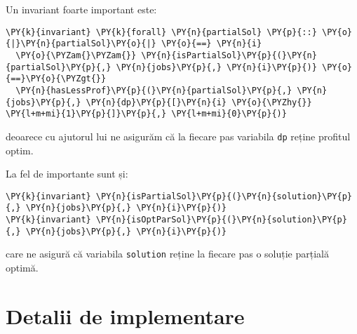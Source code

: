 Un invariant foarte important este:
\begin{Verbatim}[commandchars=\\\{\}, fontsize=\footnotesize]
\PY{k}{invariant} \PY{k}{forall} \PY{n}{partialSol} \PY{p}{::} \PY{o}{|}\PY{n}{partialSol}\PY{o}{|} \PY{o}{==} \PY{n}{i}
  \PY{o}{\PYZam{}\PYZam{}} \PY{n}{isPartialSol}\PY{p}{(}\PY{n}{partialSol}\PY{p}{,} \PY{n}{jobs}\PY{p}{,} \PY{n}{i}\PY{p}{)} \PY{o}{==}\PY{o}{\PYZgt{}} 
  \PY{n}{hasLessProf}\PY{p}{(}\PY{n}{partialSol}\PY{p}{,} \PY{n}{jobs}\PY{p}{,} \PY{n}{dp}\PY{p}{[}\PY{n}{i} \PY{o}{\PYZhy{}} \PY{l+m+mi}{1}\PY{p}{]}\PY{p}{,} \PY{l+m+mi}{0}\PY{p}{)}
\end{Verbatim}
deoarece cu ajutorul lui ne asigurăm că la fiecare pas variabila \texttt{dp} reține profitul optim. 

La fel de importante sunt și:
\begin{Verbatim}[commandchars=\\\{\}, fontsize=\footnotesize]
\PY{k}{invariant} \PY{n}{isPartialSol}\PY{p}{(}\PY{n}{solution}\PY{p}{,} \PY{n}{jobs}\PY{p}{,} \PY{n}{i}\PY{p}{)}
\PY{k}{invariant} \PY{n}{isOptParSol}\PY{p}{(}\PY{n}{solution}\PY{p}{,} \PY{n}{jobs}\PY{p}{,} \PY{n}{i}\PY{p}{)}
\end{Verbatim}
care ne asigură că variabila \texttt{solution} reține la fiecare pas o soluție parțială optimă. \\

\section{Detalii de implementare}

